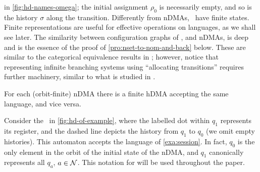 in \cref{fig:hd-names-omega}; the initial assignment $\rho_0$ is necessarily empty, and so is the history $\sigma$ along the transition.
%
%
Differently from nDMAs, \hdmas\ have finite states. 
Finite representations are useful for effective operations on languages, as we shall see later. The similarity between configuration graphs of \hdmas, and nDMAs, is deep and is the essence of the proof of \autoref{pro:nset-to-nom-and-back} below. These are similar to the categorical equivalence results in \cite{GadducciMM06,FioreS06}; however, notice that representing infinite branching systems using  ``allocating transitions'' requires further machinery, similar to what is studied in \cite{CianciaM10}.

%	
%

\begin{proposition}\label{pro:nset-to-nom-and-back}
 For each (orbit-finite) nDMA there is a finite hDMA accepting the same language, and vice versa.
\end{proposition}

\begin{example}
Consider the \hdma\ in \autoref{fig:hd-of-example},
%
where the labelled dot within $q_1$ represents its register, and the dashed line depicts the history from $q_1$ to $q_0$ (we omit empty histories). This automaton accepts the language of \cref{exa:session}. In fact, $q_0$ is the only element in the orbit of the initial state of the nDMA, and $q_1$ canonically represents all $q_a$, $a \in \mathcal{N}$. This notation for \hdmas{} will be used throughout the paper.
\end{example}

